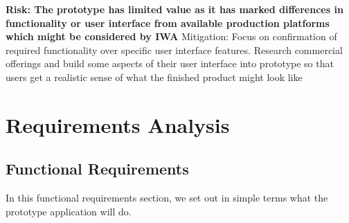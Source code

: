 \documentclass[a4paper,Times New Roman 11pt]{article}
\begin{document}
\begin{samepage}
\noindent\makebox[\linewidth]{\rule{\textwidth}{0.4pt}}
\textbf{Risk: The prototype has limited value as it has marked differences in functionality or user interface from available production platforms which might be considered by IWA}
\newline Mitigation: Focus on confirmation of required functionality over specific user interface features. Research commercial offerings and build some aspects of their user interface into prototype so that users get a realistic sense of what the finished product might look like
\newpage

\section {Requirements Analysis}
\subsection {Functional Requirements }

In this functional requirements section, we set out in simple terms what the prototype application will do. 

\begin{itemize}


\end{itemize}
\end{samepage}
\end{document}
